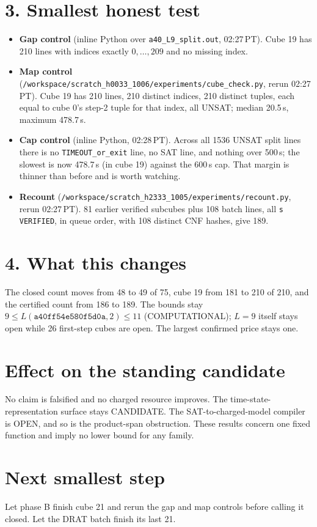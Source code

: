\documentclass[11pt]{article}
\begin{document}
\section*{3. Smallest honest test}
\begin{itemize}
\item \textbf{Gap control} (inline Python over \texttt{a40\_L9\_split.out}, 02:27\,PT). Cube 19 has 210 lines with indices exactly $0,\dots,209$ and no missing index.
\item \textbf{Map control} (\texttt{/workspace/scratch\_h0033\_1006/experiments/cube\_check.py}, rerun 02:27\,PT). Cube 19 has 210 lines, 210 distinct indices, 210 distinct tuples, each equal to cube 0's step-2 tuple for that index, all UNSAT; median 20.5\,s, maximum 478.7\,s.
\item \textbf{Cap control} (inline Python, 02:28\,PT). Across all 1536 UNSAT split lines there is no \texttt{TIMEOUT\_or\_exit} line, no SAT line, and nothing over 500\,s; the slowest is now 478.7\,s (in cube 19) against the 600\,s cap. That margin is thinner than before and is worth watching.
\item \textbf{Recount} (\texttt{/workspace/scratch\_h2333\_1005/experiments/recount.py}, rerun 02:27\,PT). 81 earlier verified subcubes plus 108 batch lines, all \texttt{s VERIFIED}, in queue order, with 108 distinct CNF hashes, give 189.
\end{itemize}

\section*{4. What this changes}
The closed count moves from 48 to 49 of 75, cube 19 from 181 to 210 of 210, and the certified count from 186 to 189. The bounds stay $9\le L(\texttt{a40ff54e580f5d0a},2)\le 11$ (COMPUTATIONAL); $L=9$ itself stays open while 26 first-step cubes are open. The largest confirmed price stays one.

\section*{Effect on the standing candidate}
No claim is falsified and no charged resource improves. The time-state-representation surface stays CANDIDATE. The SAT-to-charged-model compiler is OPEN, and so is the product-span obstruction. These results concern one fixed function and imply no lower bound for any family.

\section*{Next smallest step}
Let phase B finish cube 21 and rerun the gap and map controls before calling it closed. Let the DRAT batch finish its last 21.
\end{document}
